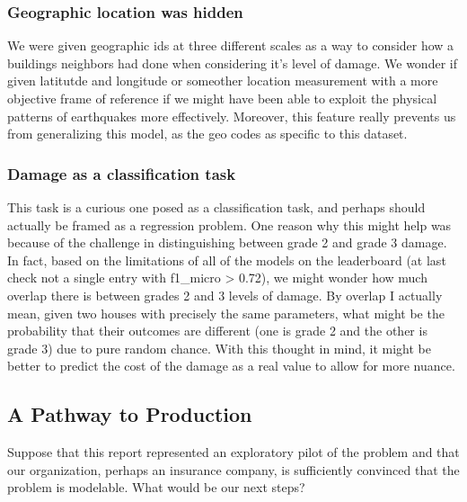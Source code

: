 \documentclass[11pt]{article}
\begin{document}
\subsubsection{Geographic location was
hidden}\label{geographic-location-was-hidden}

We were given geographic ids at three different scales as a way to
consider how a buildings neighbors had done when considering it's level
of damage. We wonder if given latitutde and longitude or someother
location measurement with a more objective frame of reference if we
might have been able to exploit the physical patterns of earthquakes
more effectively. Moreover, this feature really prevents us from
generalizing this model, as the geo codes as specific to this dataset.

\subsubsection{Damage as a classification
task}\label{damage-as-a-classification-task}

This task is a curious one posed as a classification task, and perhaps
should actually be framed as a regression problem. One reason why this
might help was because of the challenge in distinguishing between grade
2 and grade 3 damage. In fact, based on the limitations of all of the
models on the leaderboard (at last check not a single entry with
f1\_micro \textgreater{} 0.72), we might wonder how much overlap there
is between grades 2 and 3 levels of damage. By overlap I actually mean,
given two houses with precisely the same parameters, what might be the
probability that their outcomes are different (one is grade 2 and the
other is grade 3) due to pure random chance. With this thought in mind,
it might be better to predict the cost of the damage as a real value to
allow for more nuance.

\subsection{A Pathway to Production}\label{a-pathway-to-production}

Suppose that this report represented an exploratory pilot of the problem
and that our organization, perhaps an insurance company, is sufficiently
convinced that the problem is modelable. What would be our next steps?
\end{document}
